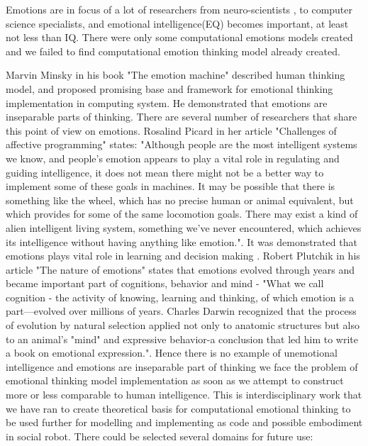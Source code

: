 Emotions are in focus of a lot of researchers from neuro-scientists \cite{emotionsbraintorobot, parsingreward, neuromodulatory, cubeofemotions}, to computer science specialists\cite{emotionandsociable, senticcomputing, hourglass, affectivemodelofinterplay, affectivecomputing}, and emotional intelligence(EQ) becomes important, at least not less than IQ.
There were only some computational emotions models created\cite{computationalmodelsemotion, computationalmodelsemotionscognition, evaluatingcomutationalmodel, threelevel} and we failed to find computational emotion thinking model already created.

Marvin Minsky in his book "The emotion machine"\cite{emotionmachine} described human thinking model, and proposed promising base and framework for emotional thinking implementation in computing system. He demonstrated that emotions are inseparable parts of thinking. There are several number of researchers that share this point of view on emotions. Rosalind Picard in her article\cite{affectivecomputingchallanges} "Challenges of affective programming" states: "Although people are the most intelligent systems we know, and people’s emotion appears to play a vital role in regulating and guiding intelligence, it does not mean there might not be a better way to implement some of these goals in machines. It may be possible that there is something like the wheel, which has no precise human or animal equivalent, but which provides for some of the same locomotion goals. There may exist a kind of alien intelligent living system, something we’ve never encountered, which achieves its intelligence without having anything like emotion.". It was demonstrated that emotions plays vital role in learning and decision making \cite{roleofemotions}. Robert Plutchik in his article "The nature of emotions" \cite{natureofemotions} states that emotions evolved through years and became important part of cognitions, behavior and mind - "What we call cognition - the activity of knowing, learning and thinking, of which emotion is a part—evolved over millions of years. Charles Darwin recognized that the process of evolution by natural selection applied not only to anatomic structures but also to an animal’s "mind" and expressive behavior-a conclusion that led him to write a book on emotional expression.". Hence there is no example of unemotional intelligence and emotions are inseparable part of thinking we face the problem of emotional thinking model implementation as soon as we attempt to construct more or less comparable to human intelligence. This is interdisciplinary work that we have ran to create theoretical basis for computational emotional thinking to be used further for modelling and implementing as code and possible embodiment in social robot. There could be selected several domains for future use:

